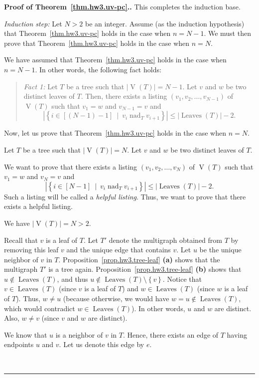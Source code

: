 \documentclass[numbers=enddot,12pt,final,onecolumn,notitlepage]{scrartcl}%
\theoremstyle{definition}
\newenvironment{statement}{\begin{quote}}{\end{quote}}
\newenvironment{proof}[1][Proof]{\noindent\textbf{#1.} }{\ \rule{0.5em}{0.5em}}
\newcommand{\set}[1]{\left\{ #1 \right\}}
\newcommand{\abs}[1]{\left| #1 \right|}
\newcommand{\tup}[1]{\left( #1 \right)}
\newcommand{\ive}[1]{\left[ #1 \right]}
\newcommand{\verts}[1]{\operatorname{V}\left( #1 \right)}
\newcommand{\leaves}[1]{\operatorname{Leaves}\left( #1 \right)}
\begin{document}
\begin{proof}[Proof of Theorem~\ref{thm.hw3.uv-pc}.]
This completes the induction base.

\textit{Induction step:} Let $N > 2$ be an integer.
Assume (as the induction hypothesis) that 
Theorem~\ref{thm.hw3.uv-pc} holds in the case when $n = N - 1$.
We must then prove that Theorem~\ref{thm.hw3.uv-pc} holds in the
case when $n = N$.

We have assumed that Theorem~\ref{thm.hw3.uv-pc} holds in the case
when $n = N - 1$.
In other words, the following fact holds:

\begin{statement}
  \textit{Fact 1:}
  Let $T$ be a tree such that $\abs{\verts{T}} = N - 1$.
  Let $v$ and $w$ be two distinct leaves of $T$.
  Then, there exists a listing $\tup{v_1, v_2, \ldots, v_{N-1}}$ of
  $\verts{T}$ such that $v_1 = w$ and $v_{N-1} = v$ and
  \[
  \abs{\set{i \in \ive{\tup{N-1}-1} \ \mid \ v_i \operatorname{nad}_T v_{i+1} }}
  \leq \abs{\leaves{T}} - 2.
  \]
\end{statement}

Now, let us prove that Theorem~\ref{thm.hw3.uv-pc} holds in the
case when $n = N$.

Let $T$ be a tree such that $\abs{\verts{T}} = N$.
Let $v$ and $w$ be two distinct leaves of $T$.

We want to prove that there exists a listing
$\tup{v_1, v_2, \ldots, v_N}$ of
$\verts{T}$ such that $v_1 = w$ and $v_N = v$ and
\[
\abs{\set{i \in \ive{N-1} \ \mid \ v_i \operatorname{nad}_T v_{i+1} }}
\leq \abs{\leaves{T}} - 2.
\]
Such a listing will be called a \textit{helpful listing}.
Thus, we want to prove that there exists a helpful listing.

We have $\abs{\verts{T}} = N > 2$.

Recall that $v$ is a leaf of $T$.
Let $T'$ denote the multigraph obtained from $T$ by
removing this leaf $v$ and the unique edge that contains $v$.
Let $u$ be the unique neighbor of $v$ in $T$.
Proposition~\ref{prop.hw3.tree-leaf} \textbf{(a)} shows that
the multigraph $T'$ is a tree again.
Proposition~\ref{prop.hw3.tree-leaf} \textbf{(b)} shows that
$u \notin \leaves{T}$, and thus
$u \notin \leaves{T} \setminus \set{v}$.
Notice that $v \in \leaves{T}$ (since $v$ is a leaf of $T$)
and $w \in \leaves{T}$ (since $w$ is a leaf of $T$).
Thus, $w \neq u$ (because otherwise, we would have
$w = u \notin \leaves{T}$, which would contradict
$w \in \leaves{T}$).
In other words, $u$ and $w$ are distinct.
Also, $w \neq v$ (since $v$ and $w$ are distinct).

We know that $u$ is a neighbor of $v$ in $T$.
Hence, there exists an edge of $T$ having endpoints $u$ and $v$.
Let us denote this edge by $e$.


\end{proof}
\end{document}
